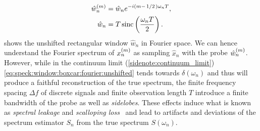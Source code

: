 \begin{align}
    \hat{w}_n\gth{m} &= \hat{w}_n \e^{-\i(m - \flatfrac{1}{2})\omega_n T}, \label{eq:speck:window:boxcar:fourier}\\
             \hat{w}_n &= T\sinc\left(\frac{\omega_n T}{2}\right). \label{eq:speck:window:boxcar:fourier:unshifted}
\end{align}
 shows the unshifted rectangular window $\hat{w}_n$ in Fourier space.
We can hence understand the Fourier spectrum of $x_n^{(m)}$ as sampling $\hat{x}_n$ with the probe $\hat{w}_n^{(m)}$.
However, while in the continuum limit (\cref{sidenote:continuum_limit}) \cref{eq:speck:window:boxcar:fourier:unshifted} tends towards $\delta(\omega_n)$ and thus will produce a faithful reconstruction of the true spectrum, the finite frequency spacing $\Delta f$ of discrete signals and finite observation length $T$ introduce a finite bandwidth of the probe as well as \emph{sidelobes}.
These effects induce what is known as \emph{spectral leakage} and \emph{scalloping loss}~\cite{Harris1978,Koopmans1995} and lead to artifacts and deviations of the spectrum estimator $S_n$ from the true spectrum $S(\omega_n)$.

